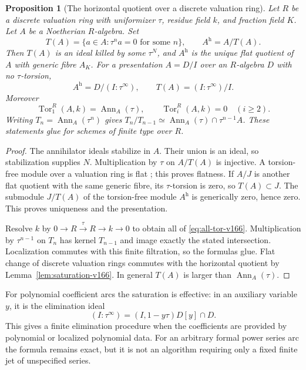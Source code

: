 \documentclass[11pt,reqno]{amsart}
\numberwithin{equation}{section}
\newtheorem{proposition}[theorem]{Proposition}
\theoremstyle{definition}\newtheorem{definition}[theorem]{Definition}
\theoremstyle{remark}\newtheorem{remark}[theorem]{Remark}
\begin{document}
\begin{proposition}[The horizontal quotient over a discrete valuation ring]
\label{prop:dvr-horizontal-v166}
Let $R$ be a discrete valuation ring with uniformizer $\tau$, residue
field $k$, and fraction field $K$. Let $A$ be a Noetherian $R$-algebra.
Set
\[
 T(A)=\{a\in A:\tau^n a=0\text{ for some }n\},\qquad A^{\mathrm h}=A/T(A).
\]
Then $T(A)$ is an ideal killed by some $\tau^N$, and $A^{\mathrm h}$
is the unique flat quotient of $A$ with generic fibre $A_K$.
For a presentation $A=D/I$ over an $R$-algebra $D$ with no
$\tau$-torsion,
\begin{equation}\label{eq:dvr-saturation-v166}
 A^{\mathrm h}=D/(I:\tau^\infty),\qquad
 T(A)=(I:\tau^\infty)/I.
\end{equation}
Moreover
\begin{equation}\label{eq:all-tor-v166}
 \operatorname{Tor}_1^R(A,k)=\operatorname{Ann}_A(\tau),\qquad
 \operatorname{Tor}_i^R(A,k)=0\quad(i\geq2).
\end{equation}
Writing $T_n=\operatorname{Ann}_A(\tau^n)$ gives
$T_n/T_{n-1}\simeq\operatorname{Ann}_A(\tau)\cap\tau^{n-1}A$.
These statements glue for schemes of finite type over $R$.
\end{proposition}
\begin{proof}
The annihilator ideals stabilize in $A$. Their union is an ideal,
so stabilization supplies $N$. Multiplication by $\tau$ on
$A/T(A)$ is injective. A torsion-free module over a valuation ring
is flat \cite[Tag 0539]{Stacks164}; this proves flatness. If $A/J$
is another flat quotient with the same generic fibre, its
$\tau$-torsion is zero, so $T(A)\subset J$. The submodule
$J/T(A)$ of the torsion-free module $A^{\mathrm h}$ is generically
zero, hence zero. This proves uniqueness and the presentation.

Resolve $k$ by $0\to R\xrightarrow{\tau}R\to k\to0$ to obtain
all of \eqref{eq:all-tor-v166}. Multiplication by $\tau^{n-1}$ on
$T_n$ has kernel $T_{n-1}$ and image exactly the stated intersection.
Localization commutes with this finite filtration, so the formulas
glue. Flat change of discrete valuation rings commutes with the
horizontal quotient by Lemma~\ref{lem:saturation-v166}. In general
$T(A)$ is larger than $\operatorname{Ann}_A(\tau)$.
\end{proof}

For polynomial coefficient arcs the saturation is effective: in an
auxiliary variable $y$, it is the elimination ideal
\[
 (I:\tau^\infty)=(I,1-y\tau)D[y]\cap D.
\]
This gives a finite elimination procedure when the coefficients are
provided by polynomial or localized polynomial data. For an arbitrary
formal power series arc the formula remains exact, but it is not an
algorithm requiring only a fixed finite jet of unspecified series.
\end{document}
